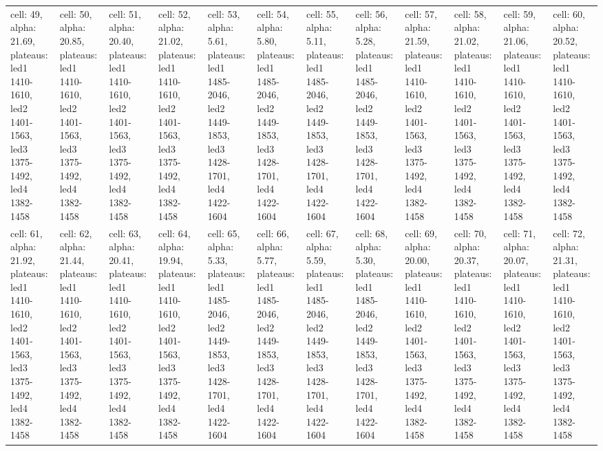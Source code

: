 \documentclass{article}
\begin{document}
\begin{landscape}
\begin{longtable}{|p{1.5cm}|p{1.5cm}|p{1.5cm}|p{1.5cm}|p{1.5cm}|p{1.5cm}|p{1.5cm}|p{1.5cm}|p{1.5cm}|p{1.5cm}|p{1.5cm}|p{1.5cm}|}
\rowcolor{lightgray} cell: 49, alpha: 21.69, plateaus: led1 1410-1610, led2 1401-1563, led3 1375-1492, led4 1382-1458 &cell: 50, alpha: 20.85, plateaus: led1 1410-1610, led2 1401-1563, led3 1375-1492, led4 1382-1458 &cell: 51, alpha: 20.40, plateaus: led1 1410-1610, led2 1401-1563, led3 1375-1492, led4 1382-1458 &cell: 52, alpha: 21.02, plateaus: led1 1410-1610, led2 1401-1563, led3 1375-1492, led4 1382-1458 &cell: 53, alpha: 5.61, plateaus: led1 1485-2046, led2 1449-1853, led3 1428-1701, led4 1422-1604 &cell: 54, alpha: 5.80, plateaus: led1 1485-2046, led2 1449-1853, led3 1428-1701, led4 1422-1604 &cell: 55, alpha: 5.11, plateaus: led1 1485-2046, led2 1449-1853, led3 1428-1701, led4 1422-1604 &cell: 56, alpha: 5.28, plateaus: led1 1485-2046, led2 1449-1853, led3 1428-1701, led4 1422-1604 &cell: 57, alpha: 21.59, plateaus: led1 1410-1610, led2 1401-1563, led3 1375-1492, led4 1382-1458 &cell: 58, alpha: 21.02, plateaus: led1 1410-1610, led2 1401-1563, led3 1375-1492, led4 1382-1458 &cell: 59, alpha: 21.06, plateaus: led1 1410-1610, led2 1401-1563, led3 1375-1492, led4 1382-1458 &cell: 60, alpha: 20.52, plateaus: led1 1410-1610, led2 1401-1563, led3 1375-1492, led4 1382-1458 \\
cell: 61, alpha: 21.92, plateaus: led1 1410-1610, led2 1401-1563, led3 1375-1492, led4 1382-1458 &cell: 62, alpha: 21.44, plateaus: led1 1410-1610, led2 1401-1563, led3 1375-1492, led4 1382-1458 &cell: 63, alpha: 20.41, plateaus: led1 1410-1610, led2 1401-1563, led3 1375-1492, led4 1382-1458 &cell: 64, alpha: 19.94, plateaus: led1 1410-1610, led2 1401-1563, led3 1375-1492, led4 1382-1458 &cell: 65, alpha: 5.33, plateaus: led1 1485-2046, led2 1449-1853, led3 1428-1701, led4 1422-1604 &cell: 66, alpha: 5.77, plateaus: led1 1485-2046, led2 1449-1853, led3 1428-1701, led4 1422-1604 &cell: 67, alpha: 5.59, plateaus: led1 1485-2046, led2 1449-1853, led3 1428-1701, led4 1422-1604 &cell: 68, alpha: 5.30, plateaus: led1 1485-2046, led2 1449-1853, led3 1428-1701, led4 1422-1604 &cell: 69, alpha: 20.00, plateaus: led1 1410-1610, led2 1401-1563, led3 1375-1492, led4 1382-1458 &cell: 70, alpha: 20.37, plateaus: led1 1410-1610, led2 1401-1563, led3 1375-1492, led4 1382-1458 &cell: 71, alpha: 20.07, plateaus: led1 1410-1610, led2 1401-1563, led3 1375-1492, led4 1382-1458 &cell: 72, alpha: 21.31, plateaus: led1 1410-1610, led2 1401-1563, led3 1375-1492, led4 1382-1458 \\

\end{longtable}
\end{landscape}
\end{document}
